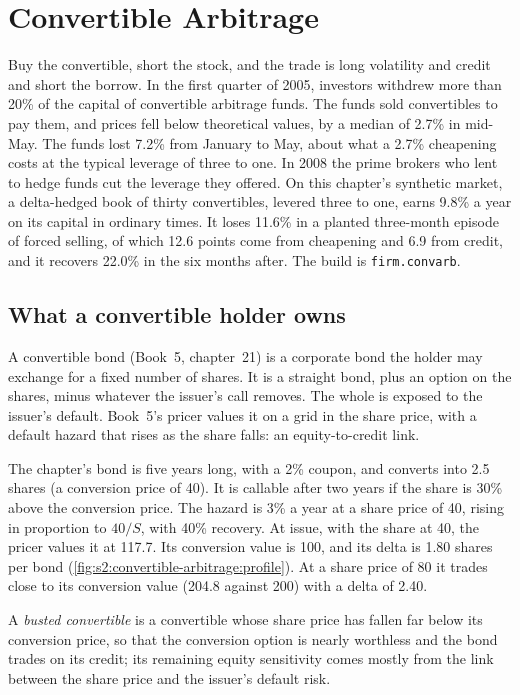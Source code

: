 \chapter{Convertible Arbitrage}\label{ch:s2:convertible-arbitrage}

Buy the convertible, short the stock, and the trade is long volatility and credit and short the borrow. In the first quarter of 2005, investors
withdrew more than 20\% of the capital of convertible arbitrage funds. The funds sold convertibles to pay them, and prices fell below theoretical
values, by a median of 2.7\% in mid-May. The funds lost 7.2\% from January to May, about what a 2.7\% cheapening costs at the typical leverage of three
to one. In 2008 the prime brokers who lent to hedge funds cut the leverage they offered. On this chapter's synthetic market, a delta-hedged book of
thirty convertibles, levered three to one, earns 9.8\% a year on its capital in ordinary times. It loses 11.6\% in a planted three-month episode of
forced selling, of which 12.6 points come from cheapening and 6.9 from credit, and it recovers 22.0\% in the six months after. The build is
\texttt{firm.convarb}.

\section{What a convertible holder owns}

A convertible bond (Book~5, chapter~21) is a corporate bond the holder may exchange for a fixed number of shares. It is a straight bond, plus an option
on the shares, minus whatever the issuer's call removes. The whole is exposed to the issuer's default. Book~5's pricer values it on a grid in the share
price, with a default hazard that rises as the share falls: an equity-to-credit link.

The chapter's bond is five years long, with a 2\% coupon, and converts into 2.5 shares (a conversion price of 40). It is callable after two years if
the share is 30\% above the conversion price. The hazard is 3\% a year at a share price of 40, rising in proportion to $40/S$, with 40\% recovery. At
issue, with the share at 40, the pricer values it at 117.7. Its conversion value is 100, and its delta is 1.80 shares per bond
(\cref{fig:s2:convertible-arbitrage:profile}). At a share price of 80 it trades close to its conversion value (204.8 against 200) with a delta of 2.40.

\begin{definition}\label{def:s2:convertible-arbitrage:busted}
A \emph{busted convertible} is a convertible whose share price has fallen far below its conversion price, so that the
conversion option is nearly worthless and the bond trades on its credit; its remaining equity sensitivity comes mostly from the link between the share
price and the issuer's default risk.
\end{definition}

